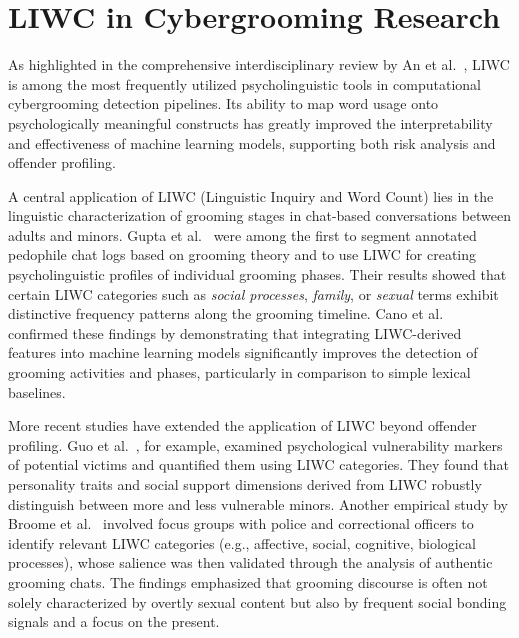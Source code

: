 \section{LIWC in Cybergrooming Research}
 As highlighted in the comprehensive interdisciplinary review by An et al.~\cite{an2025cybergrooming}, LIWC is among the most frequently utilized psycholinguistic tools in computational cybergrooming detection pipelines. Its ability to map word usage onto psychologically meaningful constructs has greatly improved the interpretability and effectiveness of machine learning models, supporting both risk analysis and offender profiling. %
 
 A central application of LIWC (Linguistic Inquiry and Word Count) lies in the linguistic characterization of grooming stages in chat-based conversations between adults and minors. Gupta et al.~\cite{gupta2012characterizingpedophileconversationsinternet} were among the first to segment annotated pedophile chat logs based on grooming theory and to use LIWC for creating psycholinguistic profiles of individual grooming phases. Their results showed that certain LIWC categories such as \textit{social processes}, \textit{family}, or \textit{sexual} terms exhibit distinctive frequency patterns along the grooming timeline. Cano et al.~\cite{Cano2014} confirmed these findings by demonstrating that integrating LIWC-derived features into machine learning models significantly improves the detection of grooming activities and phases, particularly in comparison to simple lexical baselines. %

More recent studies have extended the application of LIWC beyond offender profiling. Guo et al.~\cite{guo2023text}, for example, examined psychological vulnerability markers of potential victims and quantified them using LIWC categories. %
 They found that personality traits and social support dimensions derived from LIWC robustly distinguish between more and less vulnerable minors.  %
 Another empirical study by Broome et al.~\cite{broome2020psycholinguistic} involved focus groups with police and correctional officers to identify relevant LIWC categories (e.g., affective, social, cognitive, biological processes), whose salience was then validated through the analysis of authentic grooming chats. The findings emphasized that grooming discourse is often not solely characterized by overtly sexual content but also by frequent social bonding signals and a focus on the present. %


